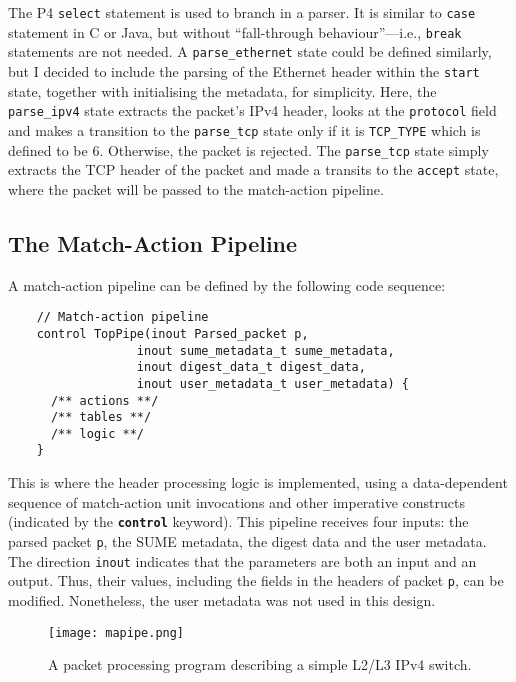 The P4 \texttt{select} statement is used to branch in a parser. It is similar to \texttt{case} statement in C or Java, but without ``fall-through behaviour''---i.e., \texttt{break} statements are not needed. A \texttt{parse\_ethernet} state could be defined similarly, but I decided to include the parsing of the Ethernet header within the \texttt{start} state, together with initialising the metadata, for simplicity. Here, the \texttt{parse\_ipv4} state extracts the packet's IPv4 header, looks at the \texttt{protocol} field and makes a transition to the \texttt{parse\_tcp} state only if it is \texttt{TCP\_TYPE} which is defined to be 6. Otherwise, the packet is rejected. The \texttt{parse\_tcp} state simply extracts the TCP header of the packet and made a transits to the \texttt{accept} state, where the packet will be passed to the match-action pipeline. 
		
	\subsection{The Match-Action Pipeline}
A match-action pipeline can be defined by the following code sequence:
{\renewcommand{\baselinestretch}{0.8}\small
	\begin{verbatim}
    // Match-action pipeline
    control TopPipe(inout Parsed_packet p,
                  inout sume_metadata_t sume_metadata, 
                  inout digest_data_t digest_data, 
                  inout user_metadata_t user_metadata) {
      /** actions **/
      /** tables **/
      /** logic **/          
    }
	\end{verbatim}
}
This is where the header processing logic is implemented, using a data-dependent sequence of match-action unit invocations and other imperative constructs (indicated by the \textbf{\texttt{control}} keyword). This pipeline receives four inputs: the parsed packet \texttt{p}, the SUME metadata, the digest data and the user metadata. The direction \texttt{inout} indicates that the parameters are both an input and an output. Thus, their values, including the fields in the headers of packet \texttt{p}, can be modified. Nonetheless, the user metadata was not used in this design.

\begin{figure}[!ht]
	\centering
	\texttt{[image: mapipe.png]}
	\caption{A packet processing program describing a simple L2/L3 IPv4 switch.}
	\label{mapipe}
\end{figure}

